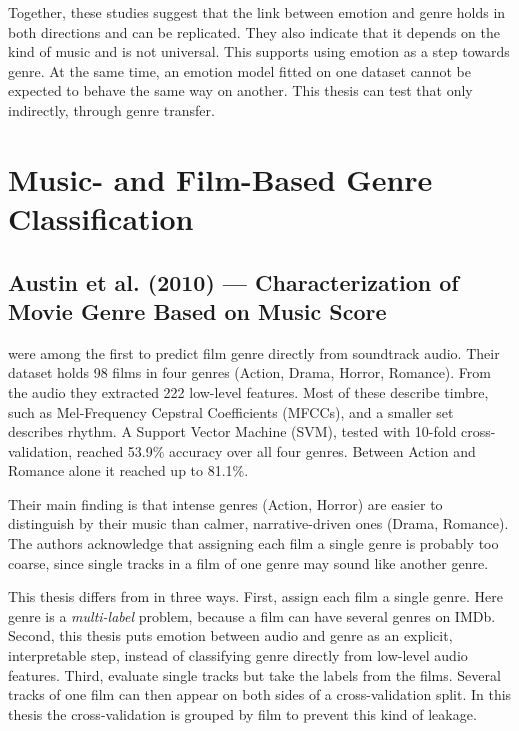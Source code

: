 Together, these studies suggest that the link between emotion and genre holds in both directions and can be replicated. They also indicate that it depends on the kind of music and is not universal. This supports using emotion as a step towards genre. At the same time, an emotion model fitted on one dataset cannot be expected to behave the same way on another. This thesis can test that only indirectly, through genre transfer.

\section{Music- and Film-Based Genre Classification}
\label{sec:relwork_genre}

\subsection{Austin et al. (2010) --- Characterization of Movie Genre Based on Music Score}

\citet{austin2010characterization} were among the first to predict film genre directly from soundtrack audio. Their dataset holds 98 films in four genres (Action, Drama, Horror, Romance). From the audio they extracted 222 low-level features. Most of these describe timbre, such as Mel-Frequency Cepstral Coefficients (MFCCs), and a smaller set describes rhythm. A Support Vector Machine (SVM), tested with 10-fold cross-validation, reached 53.9\% accuracy over all four genres. Between Action and Romance alone it reached up to 81.1\%.

Their main finding is that intense genres (Action, Horror) are easier to distinguish by their music than calmer, narrative-driven ones (Drama, Romance).  The authors acknowledge that assigning each film a single genre is probably too coarse, since single tracks in a film of one genre may sound like another genre.

This thesis differs from \citet{austin2010characterization} in three ways. First, \citeauthor{austin2010characterization} assign each film a single genre. Here genre is a \emph{multi-label} problem, because a film can have several genres on IMDb. Second, this thesis puts emotion between audio and genre as an explicit, interpretable step, instead of classifying genre directly from low-level audio features. Third, \citeauthor{austin2010characterization} evaluate single tracks but take the labels from the films. Several tracks of one film can then appear on both sides of a cross-validation split. In this thesis the cross-validation is grouped by film to prevent this kind of leakage.

